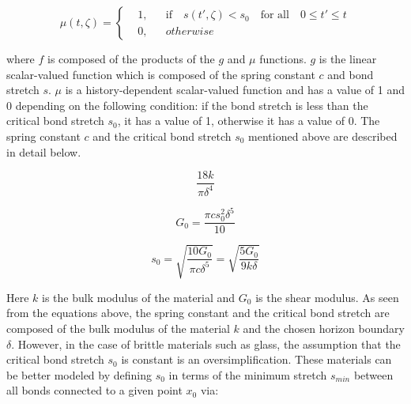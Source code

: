 \begin{equation}
  \mu(t,\zeta) = \left \{
  \begin{aligned}
    &1, && \textrm{if} \quad s(t',\zeta)<s_0 \quad \textrm{for all} \quad 0 \leq t' \leq t\\
    &0, && otherwise
  \end{aligned} \right.
\end{equation}


\noindent where $f$ is composed of the products of the $g$ and $\mu$ functions. $g$ is the linear scalar-valued function which is composed of the spring constant $c$ and bond stretch $s$. $\mu$ is a history-dependent scalar-valued function and has a value of 1 and 0 depending on the following condition: if the bond stretch is less than the critical bond stretch $s_0$, it has a value of 1, otherwise it has a value of 0. The spring constant $c$ and the critical bond stretch $s_0$ mentioned above are described in detail below.

 \begin{equation}
\frac{18k}{\pi\delta^4}
\end{equation}

 \begin{equation}
G_0=\frac{\pi cs_0^2\delta^5}{10} 
\end{equation}

 \begin{equation}
s_0=\sqrt{\frac{10G_0}{\pi c\delta^5}}=\sqrt{\frac{5G_0}{9 k\delta}}
\end{equation}

 \noindent Here $k$ is the bulk modulus of the material and $G_0$ is the shear modulus.%
 As seen from the equations above, the spring constant and the critical bond stretch are composed of the bulk modulus of the material $k$ and the chosen horizon boundary $\delta$.
 However, in the case of brittle materials such as glass, the assumption that the critical bond stretch $s_0$ is constant is an oversimplification.  These materials can be better modeled by defining $s_0$ in terms of the minimum stretch $s_{min}$ between all bonds connected to a given point $x_0$ via:

